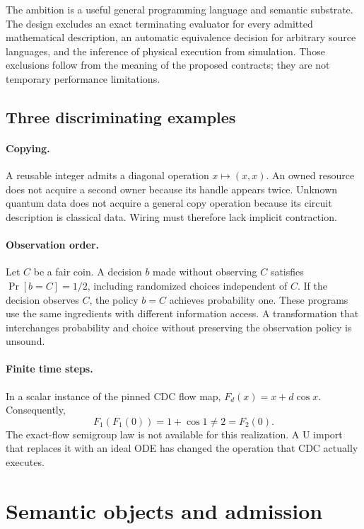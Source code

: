 \documentclass[11pt]{article}
\theoremstyle{remark}
\newcommand{\cdc}{\textsc{CDC}}
\begin{document}
The ambition is a useful general programming language and semantic substrate.
The design excludes an exact terminating evaluator for every admitted
mathematical description, an automatic equivalence decision for arbitrary
source languages, and the inference of physical execution from simulation.
Those exclusions follow from the meaning of the proposed contracts; they
are not temporary performance limitations.

\subsection{Three discriminating examples}

\paragraph{Copying.} A reusable integer admits a diagonal operation
$x\mapsto(x,x)$. An owned resource does not acquire a second owner because
its handle appears twice. Unknown quantum data does not acquire a general
copy operation because its circuit description is classical data. Wiring
must therefore lack implicit contraction.

\paragraph{Observation order.} Let $C$ be a fair coin. A decision $b$ made
without observing $C$ satisfies $\Pr[b=C]=1/2$, including randomized choices
independent of $C$. If the decision observes $C$, the policy $b=C$ achieves
probability one. These programs use the same ingredients with different
information access. A transformation that interchanges probability and
choice without preserving the observation policy is unsound.

\paragraph{Finite time steps.} In a scalar instance of the pinned \cdc{}
flow map, $F_d(x)=x+d\cos x$. Consequently,
\[
 F_1(F_1(0))=1+\cos 1 \ne 2=F_2(0).
\]
The exact-flow semigroup law is not available for this realization. A U
import that replaces it with an ideal ODE has changed the operation that
\cdc{} actually executes.

\section{Semantic objects and admission}
\label{sec:objects}
\end{document}

